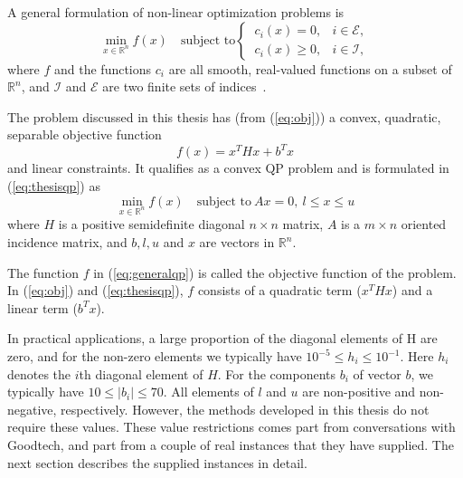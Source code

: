 A general formulation of non-linear optimization problems is
\begin{equation}
    \label{eq:generalqp}
    \min_{x \in \mathbb{R}^n} f(x) \quad \textrm{subject to}
    \begin{cases}
        ~c_i(x) = 0,   & i \in \mathcal{E}, \\
        ~c_i(x) \ge 0, & i \in \mathcal{I},
    \end{cases}
\end{equation}
where $f$ and the functions $c_i$ are all smooth, real-valued functions on a
subset of $\mathbb{R}^n$, and $\mathcal{I}$ and $\mathcal{E}$ are two finite
sets of indices~\cite{nocedal}.

The problem discussed in this thesis has (from (\ref{eq:obj})) a convex,
quadratic, separable objective function
\[
    f(x) = x^T H x + b^T x
\]
and linear constraints. It qualifies as a convex QP problem and is formulated in
(\ref{eq:thesisqp}) as
\[
    \min_{x \in \mathbb{R}^n} f(x)\quad\textrm{subject to}~Ax = 0, ~l \leq x \leq u
\]
where $H$ is a positive semidefinite diagonal $n \times n$ matrix, $A$ is a
$m \times n$ oriented incidence matrix, and $b, l, u$ and $x$ are vectors in
$\mathbb{R}^n$.

The function $f$ in (\ref{eq:generalqp}) is called the objective function of
the problem. In (\ref{eq:obj}) and (\ref{eq:thesisqp}), $f$ consists of a
quadratic term ($x^T H x$) and a linear term ($b^T x$).

In practical applications, a large proportion of the diagonal elements of H are
zero, and for the non-zero elements we typically have
$10^{-5} \le h_i \le 10^{-1}$. Here $h_i$ denotes the $i$th diagonal element of
$H$. For the components $b_i$ of vector $b$, we typically have
$10 \le |b_i| \le 70$. All elements of $l$ and $u$ are non-positive 
and non-negative, respectively. However, the methods developed in this thesis
do not require these values.
These value restrictions comes part from conversations with Goodtech, and
part from a couple of real instances that they have supplied.
The next section describes the supplied instances in detail.
